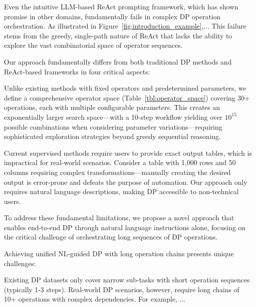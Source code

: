 Even the intuitive LLM-based ReAct prompting framework, which has shown promise in other domains, fundamentally fails in complex DP operation orchestration.
As illustrated in Figure~\ref{fig:introduction_example},...
This failure stems from the greedy, single-path nature of ReAct that lacks the ability to explore the vast combinatorial space of operator sequences.

 Our approach fundamentally differs from both traditional DP methods and ReAct-based frameworks in four critical aspects:

 Unlike existing methods with fixed operators and predetermined parameters, we define a comprehensive operator space (Table~\ref{tbl:operator_space}) covering 30+ operations, each with multiple configurable parameters. This creates an exponentially larger search space—with a 10-step workflow yielding over $10^{15}$ possible combinations when considering parameter variations—requiring sophisticated exploration strategies beyond greedy sequential reasoning.

 Current supervised methods require users to provide exact output tables, which is impractical for real-world scenarios. Consider a table with 1,000 rows and 50 columns requiring complex transformations—manually creating the desired output is error-prone and defeats the purpose of automation. Our approach only requires natural language descriptions, making DP accessible to non-technical users.

 To address these fundamental limitations, we propose a novel approach that enables end-to-end DP through natural language instructions alone, focusing on the critical challenge of orchestrating long sequences of DP operations.

 Achieving unified NL-guided DP with long operation chains presents unique challenges:

 Existing DP datasets only cover narrow sub-tasks with short operation sequences (typically 1-3 steps). Real-world DP scenarios, however, require long chains of 10+ operations with complex dependencies. For example, ...

